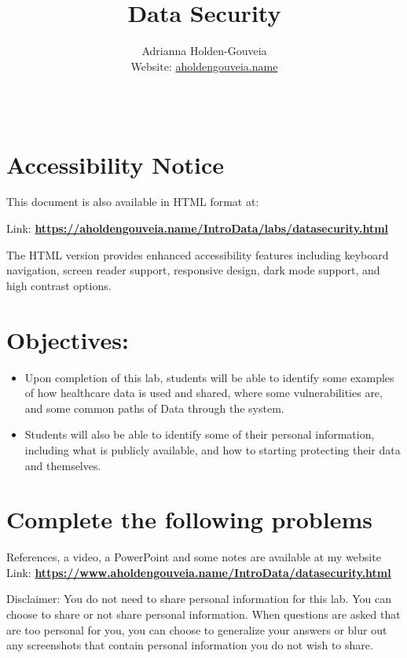 \documentclass[12pt]{article}
\title{Data Security}
\author{
        Adrianna Holden-Gouveia \\
        Website: \href{https://aholdengouveia.name}{aholdengouveia.name}\\ 
        \date{\vspace{-5ex}}
        \faGithub {: aholdengouveia} \\
        }
\begin{document}
    

\maketitle



\section*{Accessibility Notice}
This document is also available in HTML format at:

Link: \href{https://aholdengouveia.name/IntroData/labs/datasecurity.html}{\textbf{https://aholdengouveia.name/IntroData/labs/datasecurity.html}}

The HTML version provides enhanced accessibility features including keyboard navigation, screen reader support, responsive design, dark mode support, and high contrast options.

\section*{Objectives:}
\begin{itemize}
    \item Upon completion of this lab, students will be able to identify some examples of how healthcare data is used and shared, where some vulnerabilities are, and some common paths of Data through the system.  
    \item Students will also be able to identify some of their personal information, including what is publicly available, and how to starting protecting their data and themselves.
\end{itemize}
\section*{Complete the following problems}

References, a video, a PowerPoint and some notes are available at my website
Link: \href{https://www.aholdengouveia.name/IntroData/datasecurity.html}{\textbf{https://www.aholdengouveia.name/IntroData/datasecurity.html}}

Disclaimer: You do not need to share personal information for this lab.  You can choose to share or not share personal information.  When questions are asked that are too personal for you, you can choose to generalize your answers or blur out any screenshots that contain personal information you do not wish to share. 
\end{document}
